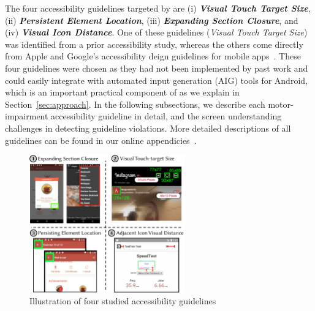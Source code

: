 The four accessibility guidelines targeted by \MotorEase are (i) \textit{\textbf{Visual Touch Target Size}}, (ii) \textit{\textbf{Persistent Element Location}}, (iii) \textit{\textbf{Expanding Section Closure}}, and (iv) \textit{\textbf{Visual Icon Distance}}. One of these guidelines (\textit{Visual Touch Target Size}) was identified from a prior accessibility study, whereas the others come directly from Apple and Google's accessibility deign guidelines for mobile apps~\cite{AppleAccess,GoogleAccess}. These four guidelines were chosen as they had not been implemented by past work and could easily integrate with automated input generation (AIG) tools for Android, which is an important practical component of \MotorEase as we explain in Section~\ref{sec:approach}.  
In the following subsections, we describe each motor-impairment accessibility guideline in detail, and the screen understanding challenges in detecting guideline violations. More detailed descriptions of all  guidelines can be found in our online appendicies~\cite{appendix,site,zenodo}.  

\begin{figure}[t]
    \centering
    \includegraphics[width=0.6\textwidth]{imgs/guidelines.pdf}
    \caption{Illustration of four studied accessibility guidelines}
    \label{AllDetectors}
\end{figure}


